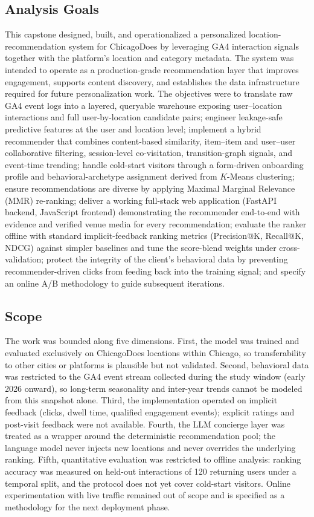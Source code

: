\documentclass[12pt,letterpaper]{article}
\begin{document}
\subsection{Analysis Goals}\label{sec:goals}

This capstone designed, built, and operationalized a personalized
location-recommendation system for ChicagoDoes by leveraging GA4
interaction signals together with the platform's location and category
metadata. The system was intended to operate as a production-grade
recommendation layer that improves engagement, supports content
discovery, and establishes the data infrastructure required for future
personalization work. The objectives were to translate raw GA4 event
logs into a layered, queryable warehouse exposing user--location
interactions and full user-by-location candidate pairs; engineer
leakage-safe predictive features at the user and location level;
implement a hybrid recommender that combines content-based similarity,
item--item and user--user collaborative filtering, session-level
co-visitation, transition-graph signals, and event-time trending;
handle cold-start visitors through a form-driven onboarding profile
and behavioral-archetype assignment derived from $K$-Means clustering;
ensure recommendations are diverse by applying Maximal Marginal
Relevance (MMR) re-ranking; deliver a working full-stack web
application (FastAPI backend, JavaScript frontend) demonstrating the
recommender end-to-end with evidence and verified venue media for
every recommendation; evaluate the ranker offline with standard
implicit-feedback ranking metrics (Precision@K, Recall@K, NDCG)
against simpler baselines and tune the score-blend weights under
cross-validation; protect the integrity of the client's behavioral
data by preventing recommender-driven clicks from feeding back into
the training signal; and specify an online A/B methodology to guide
subsequent iterations.

\subsection{Scope}\label{sec:scope}

The work was bounded along five dimensions. First, the model was
trained and evaluated exclusively on ChicagoDoes locations within
Chicago, so transferability to other cities or platforms is plausible
but not validated. Second, behavioral data was restricted to the GA4
event stream collected during the study window (early 2026 onward),
so long-term seasonality and inter-year trends cannot be modeled from
this snapshot alone. Third, the implementation operated on implicit
feedback (clicks, dwell time, qualified engagement events); explicit
ratings and post-visit feedback were not available. Fourth, the LLM
concierge layer was treated as a wrapper around the deterministic
recommendation pool; the language model never injects new locations
and never overrides the underlying ranking. Fifth, quantitative
evaluation was restricted to offline analysis: ranking accuracy was
measured on held-out interactions of 120 returning users under a
temporal split, and the protocol does not yet cover cold-start
visitors. Online experimentation with live traffic remained out of
scope and is specified as a methodology for the next deployment
phase.
\end{document}
